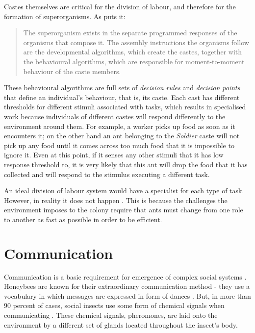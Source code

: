 Castes themselves are critical for the division of labour, and therefore for the formation of superorganisms. As \citeauthor{citeulike:3731267} \cite{citeulike:3731267} puts it:

\begin{quotation}The superorganism exists in the separate programmed responses of the organisms that compose it. The assembly instructions the organisms follow are the developmental algorithms, which create the castes, together with the behavioural algorithms, which are responsible for moment-to-moment behaviour of the caste members.
\end{quotation}


These behavioural algorithms are full sets of \emph{decision rules} and \emph{decision points} that define an individual's behaviour, that is, its caste. Each cast has different thresholds for different stimuli associated with tasks, which results in specialised work because individuals of different castes will respond differently to the environment around them. For example, a worker picks up food as soon as it encounters it; on the other hand an ant belonging to the \emph{Soldier} caste will not pick up any food until it comes across too much food that it is impossible to ignore it. Even at this point, if it senses any other stimuli that it has low response threshold to, it is very likely that this ant will drop the food that it has collected and will respond to the stimulus executing a different task.

An ideal division of labour system would have a specialist for each type of task. However, in reality it does not happen \cite{wilson1968} \cite{oster1979caste}. This is because the challenges the environment imposes to the colony require that ants must change from one role to another as fast as possible in order to be efficient.

\section {Communication}
\label{sec:ant-comm}

Communication is a basic requirement for emergence of complex social systems  \cite{seeley1995wisdom}. Honeybees are known for their extraordinary communication method - they use a vocabulary in which messages are expressed in form of dances \cite{Bienentanz}. But, in more than 90 percent of cases, social insects use some form of chemical signals when communicating \cite{citeulike:3731267}. These chemical signals, pheromones, are laid onto the environment by a different set of glands located throughout the insect's body. 

